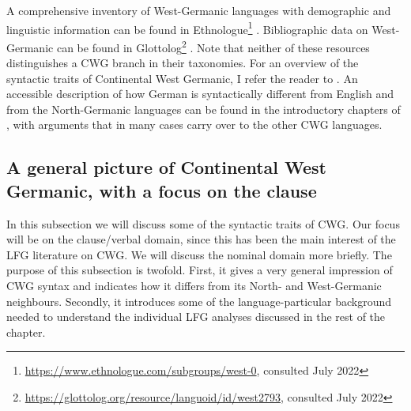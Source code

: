 \documentclass[output=paper,hidelinks]{langscibook}
\begin{document}
A comprehensive inventory of West-Germanic languages with demographic
and linguistic information can be found in
Ethnologue\footnote{\url{https://www.ethnologue.com/subgroups/west-0},
consulted July 2022} \citep{EberhardSimonsFennig2019}. Bibliographic
data on West-Germanic can be found in
Glottolog\footnote{\url{https://glottolog.org/resource/languoid/id/west2793},
consulted July 2022} \citep{glottolog}. Note that neither of these
resources distinguishes a CWG branch in their taxonomies. For an
overview of the syntactic traits of Continental West Germanic, I refer
the reader to \citet{zwart:2008}. An accessible description of how
German is syntactically different from English and from the
North-Germanic languages can be found in the introductory chapters of
\citet{haider:2010}, with arguments that in many cases carry over to
the other CWG languages.


\subsection{A general picture of Continental West Germanic, with a focus on the clause}

In this subsection we will discuss some of the syntactic traits of
CWG. Our focus will be on the clause/verbal domain, since this has
been the main interest of the LFG literature on CWG. We will discuss
the nominal domain more briefly. The purpose of this subsection is
twofold. First, it gives a very general impression of CWG syntax and
indicates how it differs from its North- and
West-Germanic neighbours. Secondly, it introduces some of the
language-particular background needed to understand the individual LFG
analyses discussed in the rest of the chapter.
\end{document}
